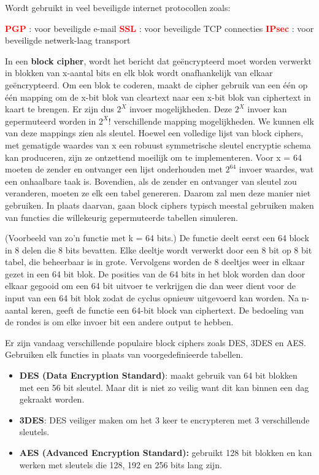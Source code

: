
Wordt gebruikt in veel beveiligde internet protocollen zoals:

\bi
\itf \textcolor{red}{\textbf{PGP}} : voor beveiligde e-mail
\itf \textcolor{red}{\textbf{SSL}} : voor beveiligde TCP connecties
\itf \textcolor{red}{\textbf{IPsec}} : voor beveiligde netwerk-laag transport
\ei

	
\noindent In een \textbf{block cipher}, wordt het bericht dat geëncrypteerd moet worden verwerkt in blokken van x-aantal bits en elk blok wordt onafhankelijk van elkaar geëncrypteerd. Om een blok te coderen, maakt de cipher gebruik van een één op één mapping om de x-bit blok van cleartext naar een x-bit blok van ciphertext in kaart te brengen. Er zijn dus $2^X$ invoer mogelijkheden. Deze $2^X$ invoer kan gepermuteerd worden in $2^X$! verschillende mapping mogelijkheden. We kunnen elk van deze mappings zien als sleutel.
Hoewel een volledige lijst van block ciphers, met gematigde waardes van x een robuust symmetrische sleutel encryptie schema kan produceren, zijn ze ontzettend moeilijk om te implementeren. Voor x = 64 moeten de zender en ontvanger een lijst onderhouden met $2^64$ invoer waardes, wat een onhaalbare taak is. Bovendien, als de zender en ontvanger van sleutel zou veranderen, moeten ze elk een tabel genereren. Daarom zal men deze manier niet gebruiken.
In plaats daarvan, gaan block ciphers typisch meestal gebruiken maken van functies die willekeurig gepermuteerde tabellen simuleren.

(Voorbeeld van zo’n functie met k = 64 bits.) De functie deelt eerst een 64 block in 8 delen die 8 bits bevatten. Elke deeltje wordt verwerkt door een 8 bit op 8 bit tabel, die beheerbaar is in grote. Vervolgens worden de 8 deeltjes weer in elkaar gezet in een 64 bit blok. De posities van de 64 bits in het blok worden dan door elkaar gegooid om een 64 bit uitvoer te verkrijgen die dan weer dient voor de input van een 64 bit blok zodat de cyclus opnieuw uitgevoerd kan worden. Na n-aantal keren, geeft de functie een 64-bit block van ciphertext. De bedoeling van de rondes is om elke invoer bit een andere output te hebben.

Er zijn vandaag verschillende populaire block ciphers zoals DES, 3DES en AES. Gebruiken elk functies in plaats van voorgedefinieerde tabellen.
\begin{itemize}
\item \textbf{DES (Data Encryption Standard)}: maakt gebruik van 64 bit blokken met een 56 bit sleutel. Maar dit is niet zo veilig want dit kan binnen een dag gekraakt worden.
\item \textbf{3DES}: DES veiliger maken om het 3 keer te encrypteren met 3 verschillende sleutels.
\item \textbf{AES (Advanced Encryption Standard): }gebruikt 128 bit blokken en kan werken met sleutels die 128, 192 en 256 bits lang zijn.

\end{itemize}


